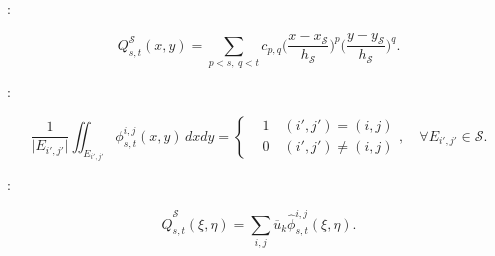 \documentclass[usenames,dvipsnames,letterpaper,landscape,final]{slides}
\begin{document}
\begin{myslide}
:

\begin{equation} \label{eq:stencilpolynomial}
		  Q^{\mathcal{S}}_{s,t}(x,y) = \sum_{p<s,\  q<t} c_{p,q} \Big(\frac{x - x_\mathcal{S}}{h_\mathcal{S}}\Big)^p 
		  \Big(\frac{y - y_\mathcal{S}}{h_\mathcal{S}}\Big)^q.
\end{equation}

\vspace{20pt}

:

\begin{equation}\label{eq:basispoly}
		  \frac{1}{\lvert E_{i',j'}\rvert } \iint_{E_{i',j'}} \phi^{i,j}_{s,t} (x,y)\, dxdy = 
		  \left \{
					 \begin{aligned}
								&1 \quad  (i',j') = (i,j)\\
								&0 \quad  (i',j') \neq (i,j)
					 \end{aligned}
					 \right. 
					 ,\quad \forall E_{i',j'} \in \mathcal{S}.
\end{equation}

\vspace{20pt}

:

\begin{equation}\label{eq:normalizedstencilpoly}
\hat{Q}^{\mathcal{S}}_{s,t}(\xi, \eta) = \sum_{i,j} \overline{u}_k \hat{\phi}_{s,t}^{i,j}(\xi, \eta).
\end{equation}

\end{myslide}
\end{document}
